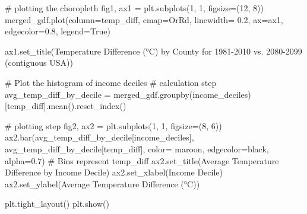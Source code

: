 \documentclass[
  letterpaper,
  DIV=11,
  numbers=noendperiod]{scrartcl}
\newenvironment{Shaded}{\begin{snugshade}}{\end{snugshade}}
\newcommand{\CommentTok}[1]{\textcolor[rgb]{0.37,0.37,0.37}{#1}}
\newcommand{\DecValTok}[1]{\textcolor[rgb]{0.68,0.00,0.00}{#1}}
\newcommand{\FloatTok}[1]{\textcolor[rgb]{0.68,0.00,0.00}{#1}}
\newcommand{\NormalTok}[1]{\textcolor[rgb]{0.00,0.23,0.31}{#1}}
\newcommand{\OperatorTok}[1]{\textcolor[rgb]{0.37,0.37,0.37}{#1}}
\newcommand{\StringTok}[1]{\textcolor[rgb]{0.13,0.47,0.30}{#1}}
\newcommand{\VariableTok}[1]{\textcolor[rgb]{0.07,0.07,0.07}{#1}}
\begin{document}
\begin{Shaded}
\begin{Highlighting}[]
\CommentTok{\# plotting the choropleth}
\NormalTok{fig1, ax1 }\OperatorTok{=}\NormalTok{ plt.subplots(}\DecValTok{1}\NormalTok{, }\DecValTok{1}\NormalTok{, figsize}\OperatorTok{=}\NormalTok{(}\DecValTok{12}\NormalTok{, }\DecValTok{8}\NormalTok{))}
\NormalTok{merged\_gdf.plot(column}\OperatorTok{=}\StringTok{\textquotesingle{}temp\_diff\textquotesingle{}}\NormalTok{,}
\NormalTok{                cmap}\OperatorTok{=}\StringTok{\textquotesingle{}OrRd\textquotesingle{}}\NormalTok{,  }
\NormalTok{                linewidth}\OperatorTok{=} \FloatTok{0.2}\NormalTok{,}
\NormalTok{                ax}\OperatorTok{=}\NormalTok{ax1,}
\NormalTok{                edgecolor}\OperatorTok{=}\StringTok{\textquotesingle{}0.8\textquotesingle{}}\NormalTok{,}
\NormalTok{                legend}\OperatorTok{=}\VariableTok{True}\NormalTok{)}

\NormalTok{ax1.set\_title(}\StringTok{\textquotesingle{}Temperature Difference (°C) by County for 1981{-}2010 vs. 2080{-}2099 (contiguous USA)\textquotesingle{}}\NormalTok{)}


\CommentTok{\# Plot the histogram of income deciles}
\CommentTok{\# calculation step}
\NormalTok{avg\_temp\_diff\_by\_decile }\OperatorTok{=}\NormalTok{ merged\_gdf.groupby(}\StringTok{\textquotesingle{}income\_deciles\textquotesingle{}}\NormalTok{)[}\StringTok{\textquotesingle{}temp\_diff\textquotesingle{}}\NormalTok{].mean().reset\_index()}

\CommentTok{\# plotting step}
\NormalTok{fig2, ax2 }\OperatorTok{=}\NormalTok{ plt.subplots(}\DecValTok{1}\NormalTok{, }\DecValTok{1}\NormalTok{, figsize}\OperatorTok{=}\NormalTok{(}\DecValTok{8}\NormalTok{, }\DecValTok{6}\NormalTok{))}
\NormalTok{ax2.bar(avg\_temp\_diff\_by\_decile[}\StringTok{\textquotesingle{}income\_deciles\textquotesingle{}}\NormalTok{], avg\_temp\_diff\_by\_decile[}\StringTok{\textquotesingle{}temp\_diff\textquotesingle{}}\NormalTok{], color}\OperatorTok{=} \StringTok{\textquotesingle{}maroon\textquotesingle{}}\NormalTok{, edgecolor}\OperatorTok{=}\StringTok{\textquotesingle{}black\textquotesingle{}}\NormalTok{, alpha}\OperatorTok{=}\FloatTok{0.7}\NormalTok{) }\CommentTok{\# Bins represent temp\_diff}
\NormalTok{ax2.set\_title(}\StringTok{\textquotesingle{}Average Temperature Difference by Income Decile\textquotesingle{}}\NormalTok{) }
\NormalTok{ax2.set\_xlabel(}\StringTok{\textquotesingle{}Income Decile\textquotesingle{}}\NormalTok{)}
\NormalTok{ax2.set\_ylabel(}\StringTok{\textquotesingle{}Average Temperature Difference (°C)\textquotesingle{}}\NormalTok{)}

\NormalTok{plt.tight\_layout()}
\NormalTok{plt.show()}
\end{Highlighting}
\end{Shaded}
\end{document}
